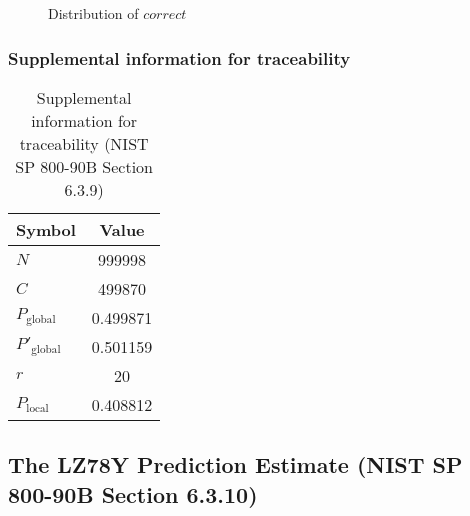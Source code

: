 \documentclass[a3paper,xelatex,english]{bxjsarticle}
\begin{document}
\begin{figure}[htbp]
\centering

\caption{Distribution of $correct$}
\end{figure}
\subsubsection{Supplemental information for traceability}
\renewcommand{\arraystretch}{1.8}
\begin{table}[h]
\caption{Supplemental information for traceability (NIST SP 800-90B Section 6.3.9)}
\begin{center}
\begin{tabular}{|l|c|}
\hline 
\rowcolor{anotherlightblue} %
Symbol				& Value \\ \hline 
$N$				& 999998\\ \hline 
$C$				& 499870\\ \hline 
$P_{\textrm{global}}$				& 0.499871\\ \hline 
$P'_{\textrm{global}}$			& 0.501159\\ \hline 
$r$				& 20\\ \hline 
$P_{\textrm{local}}$ 			& 0.408812\\ \hline
\end{tabular}
\end{center}
\end{table}
\renewcommand{\arraystretch}{1.4}
\clearpage
\subsection{The LZ78Y Prediction Estimate (NIST SP 800-90B Section 6.3.10)}\label{sec:Binary6310}
\end{document}
